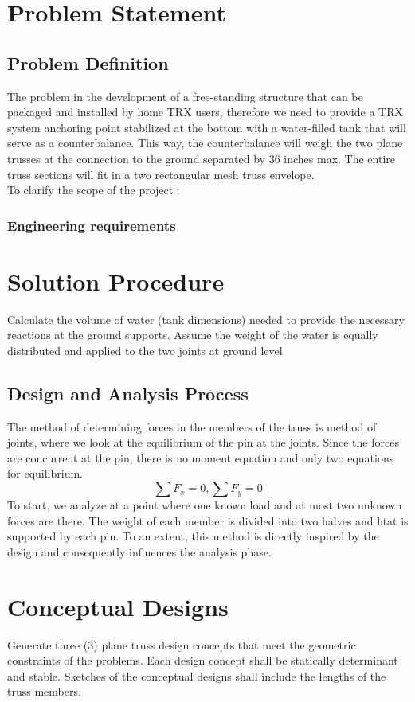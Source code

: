 \chapter{Problem Statement}
\section{Problem Definition}
The problem in the development of a free-standing structure that can be packaged and installed by home TRX users, therefore we need to provide a TRX system anchoring point stabilized at the bottom with a water-filled tank that will serve as a counterbalance. This way, the counterbalance will weigh the two plane trusses at the connection to the ground separated by $36$ inches max. The entire truss sections will fit in a two rectangular mesh truss envelope.\\

To clarify the scope of the project :
\subsection{Engineering requirements}

\chapter{Solution Procedure}
Calculate the volume of water (tank dimensions) needed to provide the necessary reactions at the ground supports.
Assume the weight of the water is equally distributed and applied to the two joints at ground level

\section{Design and Analysis Process}
The method of determining forces in the members of the truss is method of joints, where we look at the equilibrium of the pin at the joints. Since the forces are concurrent at the pin, there is no moment equation and only two equations for equilibrium.
$$ \sum F_{x} = 0, \sum F_{y} = 0 $$
To start, we analyze at a point where one known load and at most two unknown forces are there. The weight of each member is divided into two halves and htat is supported by each pin. To an extent, this method is directly inspired by the design and consequently influences the analysis phase. 
\chapter{Conceptual Designs}
Generate three (3) plane truss design concepts that meet the geometric constraints of the problems. Each design concept shall be statically determinant and stable. Sketches of the conceptual designs shall include the lengths of the truss members.

